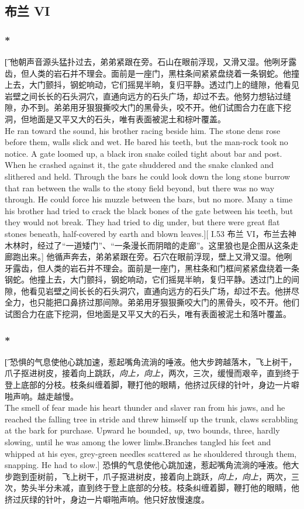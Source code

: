 \documentclass[12pt,a4paper]{article}
\begin{document}
\subsection{布兰 VI}

\subsubsection{\color{red}*}\t[
	他朝声音源头猛扑过去，弟弟紧跟在旁。石山在眼前浮现，又滑又湿。他咧牙露齿，但人类的岩石并不理会。面前是一座门，黑柱条间紧紧盘绕着一条钢蛇。他撞上去，大门颤抖，钢蛇响动，它们摇晃半晌，复归平静。透过门上的缝隙，他看见岩壁之间长长的石头洞穴，直通向远方的石头广场，却过不去。他努力想钻过缝隙，办不到。弟弟用牙狠狠撕咬大门的黑骨头，咬不开。他们试图合力在底下挖洞，但地面是又平又大的石头，唯有表面被泥土和棕叶覆盖。\\
	He ran toward the sound, his brother racing beside him. The stone dens rose before them, walls slick and wet. He bared his teeth, but the man-rock took no notice. A gate loomed up, a black iron snake coiled tight about bar and post. When he crashed against it, the gate shuddered and the snake clanked and slithered and held. Through the bars he could look down the long stone burrow that ran between the walls to the stony field beyond, but there was no way through. He could force his muzzle between the bars, but no more. Many a time his brother had tried to crack the black bones of the gate between his teeth, but they would not break. They had tried to dig under, but there were great flat stones beneath, half-covered by earth and blown leaves.][
	I.53 布兰 VI，布兰去神木林时，经过了“一道矮门”、“一条漫长而阴暗的走廊”。这里狼也是企图从这条走廊跑出来。]
	他循声奔去，弟弟紧跟在旁。石穴在眼前浮现，壁上又滑又湿。他咧牙露齿，但人类的岩石并不理会。面前是一座门，黑柱条和门框间紧紧盘绕着一条钢蛇。他撞上去，大门颤抖，钢蛇响动，它们摇晃半晌，复归平静。透过门上的间隙，他看见岩壁之间长长的石头洞穴，直通向远方的石头广场，却过不去。他拼尽全力，也只能把口鼻挤过那间隙。弟弟用牙狠狠撕咬大门的黑骨头，咬不开。他们试图合力在底下挖洞，但地面是又平又大的石头，唯有表面被泥土和落叶覆盖。
	
\subsubsection{\color{red}*}\t[
	恐惧的气息使他心跳加速，惹起嘴角流淌的唾液。他大步跨越落木，飞上树干，爪子抠进树皮，接着向上跳跃，\emph{向上，向上}，两次，三次，缓慢而艰辛，直到终于登上底部的分枝。枝条纠缠着脚，鞭打他的眼睛，他挤过灰绿的针叶，身边一片噼啪声响。越走越慢。\\
	The smell of fear made his heart thunder and slaver ran from his jaws, and he reached the falling tree in stride and threw himself up the trunk, claws scrabbling at the bark for purchase. Upward he bounded, \emph{up}, two bounds, three, hardly slowing, until he was among the lower limbs.Branches tangled his feet and whipped at his eyes, grey-green needles scattered as he shouldered through them, snapping. He had to slow.]
	恐惧的气息使他心跳加速，惹起嘴角流淌的唾液。他大步跑到歪树前，飞上树干，爪子抠进树皮，接着向上跳跃，\emph{向上，向上}，两次，三次，势头半分未减，直到终于登上底部的分枝。枝条纠缠着脚，鞭打他的眼睛，他挤过灰绿的针叶，身边一片噼啪声响。他只好放慢速度。
	
\end{document}
